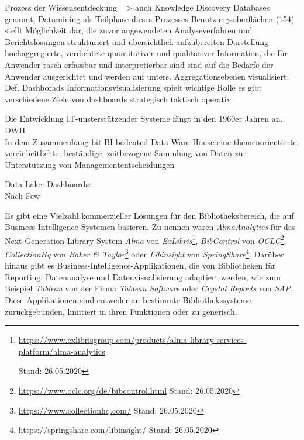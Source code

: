         Prozess der Wissensentdeckung => auch Knowledge Discovery Databases genannt, Datamining als Teilphase dieses Prozesses
    Benutzungsoberflächen (154)
        stellt Möglichkeit dar, die zuvor angewendeten Analyseverfahren und Berichtslösungen strukturiert und übersichtlich aufzubereiten
        Darstellung hochaggregierte, verdichtete quantitativer und qualitativer Information, die für Anwender rasch erfassbar und interpretierbar sind
        sind auf die Bedarfe der Anwender ausgerichtet und werden auf unters. Aggregationsebenen visualisiert.
        Def. Dashborads
        Informationsvisualisierung  spielt wichtige Rolle
        es gibt verschiedene Ziele von dashboards
        strategisch
        taktisch
        operativ

Die Entwicklung IT-unsterstützender Systeme fängt in den 1960er Jahren an.
\acrfull{DWH}\\
In dem Zusammenhang bit BI bedeuted Data Ware House eine themenorientierte, vereinheitlichte, beständige, zeitbezogene
Sammlung von Daten zur Unterstützung von Managemententscheidungen\cite[vgl.][271]{abts_grundkurs_2017}
        
Data Lake:
Dashboards:\\
Nach Few
\cite{few_information_2006}
        
        


Es gibt eine Vielzahl kommerzieller Lösungen für den Bibliotheksbereich, die auf Business-Intelligence-Systemen basieren.
Zu nennen wären \textit{AlmaAnalytics} für das Next-Generation-Library-System \textit{Alma} von \textit{ExLibris}\footnote{\url{https://www.exlibrisgroup.com/products/alma-library-services-platform/alma-analytics}

Stand: 26.05.2020}, \textit{BibControl} von \textit{OCLC}\footnote{\url{https://www.oclc.org/de/bibcontrol.html} Stand: 26.05.2020},
\textit{CollectionHq} von \textit{Baker \& Taylor}\footnote{\url{https://www.collectionhq.com/} Stand: 26.05.2020} oder \textit{Libinsight} von \textit{SpringShare}\footnote{\url{https://springshare.com/libinsight/} Stand: 26.05.2020}.
Darüber hinaus gibt es Business-Intelligence-Applikationen, die von
Bibliotheken für Reporting, Datenanalyse und Datenvisualisierung adaptiert werden,
wie zum Beispiel \textit{Tableau} von der Firma \textit{Tableau Software} oder
\textit{Crystal Reports} von \textit{SAP}.
Diese Applikationen sind entweder
an bestimmte Bibliothekssysteme zurückgebunden, limitiert in ihren
Funktionen\cite{golas_statistische_2018} oder zu generisch.
